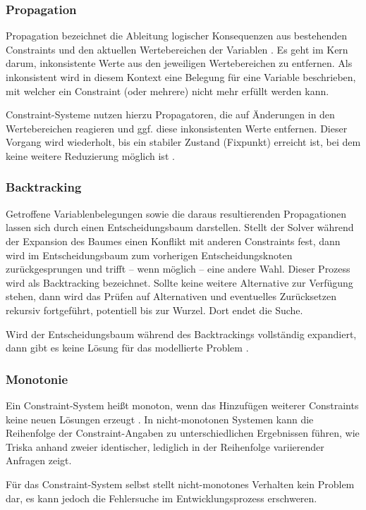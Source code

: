 \documentclass[12pt,a4paper]{article}
\begin{document}
\subsubsection{Propagation}
Propagation bezeichnet die Ableitung logischer Konsequenzen aus bestehenden Constraints und den aktuellen Wertebereichen der Variablen \cite{clp92}.
Es geht im Kern darum, inkonsistente Werte aus den jeweiligen Wertebereichen zu entfernen.
Als \glqq inkonsistent\grqq{} wird in diesem Kontext eine Belegung für eine Variable beschrieben, mit welcher ein Constraint (oder mehrere) nicht mehr erfüllt werden kann.

Constraint-Systeme nutzen hierzu Propagatoren, die auf Änderungen in den Wertebereichen reagieren und ggf. diese inkonsistenten Werte entfernen.
Dieser Vorgang wird wiederholt, bis ein stabiler Zustand (Fixpunkt) erreicht ist, bei dem keine weitere Reduzierung möglich ist \cite{clp_handbook}.
\subsubsection{Backtracking}
\label{sec:backtracking}
Getroffene Variablenbelegungen sowie die daraus resultierenden Propagationen lassen sich durch einen Entscheidungsbaum darstellen.
Stellt der Solver während der Expansion des Baumes einen Konflikt mit anderen Constraints fest, dann wird im Entscheidungsbaum zum vorherigen Entscheidungsknoten zurückgesprungen und trifft -- wenn möglich -- eine andere Wahl.
Dieser Prozess wird als Backtracking bezeichnet. \cite{clp_handbook}
Sollte keine weitere Alternative zur Verfügung stehen, dann wird das Prüfen auf Alternativen und eventuelles Zurücksetzen rekursiv fortgeführt, potentiell bis zur Wurzel.
Dort endet die Suche.

Wird der Entscheidungsbaum während des Backtrackings vollständig expandiert, dann gibt es keine Lösung für das modellierte Problem \cite{clp_book2}.
\subsubsection{Monotonie}
Ein Constraint-System heißt monoton, wenn das Hinzufügen weiterer Constraints keine neuen Lösungen erzeugt \cite{drt}\cite{swi-clpfd-doc}.
In nicht-monotonen Systemen kann die Reihenfolge der Constraint-Angaben zu unterschiedlichen Ergebnissen führen, wie Triska \cite[S. 37]{drt} anhand zweier identischer, lediglich in der Reihenfolge variierender Anfragen zeigt.

Für das Constraint-System selbst stellt nicht-monotones Verhalten kein Problem dar, es kann jedoch die Fehlersuche im Entwicklungsprozess erschweren.
\end{document}
